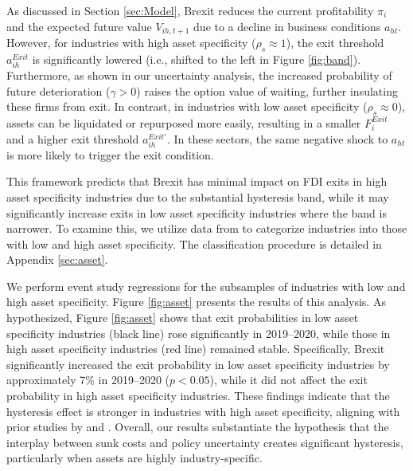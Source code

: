 \documentclass[preprint,11pt,authoryear]{elsarticle}
\begin{document}
As discussed in Section \ref{sec:Model}, Brexit reduces the current profitability $\pi_i$ and the expected future value $V_{ih,t+1}$ due to a decline in business conditions $a_{ht}$. However, for industries with high asset specificity ($\rho_s \approx 1$), the exit threshold $a_{ih}^{Exit}$ is significantly lowered (i.e., shifted to the left in Figure \ref{fig:band}). Furthermore, as shown in our uncertainty analysis, the increased probability of future deterioration ($\gamma > 0$) raises the option value of waiting, further insulating these firms from exit. In contrast, in industries with low asset specificity ($\rho_s \approx 0$), assets can be liquidated or repurposed more easily, resulting in a smaller $F_i^{Exit}$ and a higher exit threshold $a_{ih}^{Exit'}$. In these sectors, the same negative shock to $a_{ht}$ is more likely to trigger the exit condition.

This framework predicts that Brexit has minimal impact on FDI exits in high asset specificity industries due to the substantial hysteresis band, while it may significantly increase exits in low asset specificity industries where the band is narrower. To examine this, we utilize data from \cite{kermani2023asset} to categorize industries into those with low and high asset specificity. The classification procedure is detailed in Appendix \ref{sec:asset}.

We perform event study regressions for the subsamples of industries with low and high asset specificity. Figure \ref{fig:asset} presents the results of this analysis. As hypothesized, Figure \ref{fig:asset} shows that exit probabilities in low asset specificity industries (black line) rose significantly in 2019--2020, while those in high asset specificity industries (red line) remained stable. Specifically, Brexit significantly increased the exit probability in low asset specificity industries by approximately 7\% in 2019--2020 ($p < 0.05$), while it did not affect the exit probability in high asset specificity industries. These findings indicate that the hysteresis effect is stronger in industries with high asset specificity, aligning with prior studies by \cite{kermani2023asset} and \cite{kim2017asset}. Overall, our results substantiate the hypothesis that the interplay between sunk costs and policy uncertainty creates significant hysteresis, particularly when assets are highly industry-specific.
\end{document}

